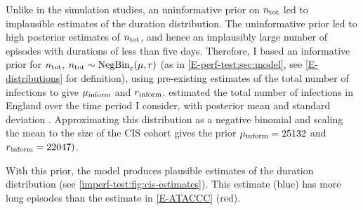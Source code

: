 \documentclass[thesis.tex]{subfiles}
\begin{document}
Unlike in the simulation studies, an uninformative prior on $n_\text{tot}$ led to implausible estimates of the duration distribution.
The uninformative prior led to high posterior estimates of $n_\text{tot}$, and hence an implausibly large number of episodes with durations of less than five days.
Therefore, I based an informative prior for $n_\text{tot}$, $n_\text{tot} \sim \operatorname{NegBin}_{c}(\mu, r)$ (as in \cref{E-perf-test:sec:model}, see \cref{E-distributions} for definition), using pre-existing estimates of the total number of infections to give $\mu{_{\text{inform}}}$ and $r{_{\text{inform}}}$.
\Textcite{birrellRTM2} estimated the total number of infections in England over the time period I consider, with posterior mean  and standard deviation .
Approximating this distribution as a negative binomial and scaling the mean to the size of the CIS cohort gives the prior $\mu{_{\text{inform}}} = 25132$ and $r{_{\text{inform}}} = 22047)$.

With this prior, the model produces plausible estimates of the duration distribution (see \cref{imperf-test:fig:cis-estimates}).
This estimate (blue) has more long episodes than the estimate in \cref{E-ATACCC} (red).
\end{document}
